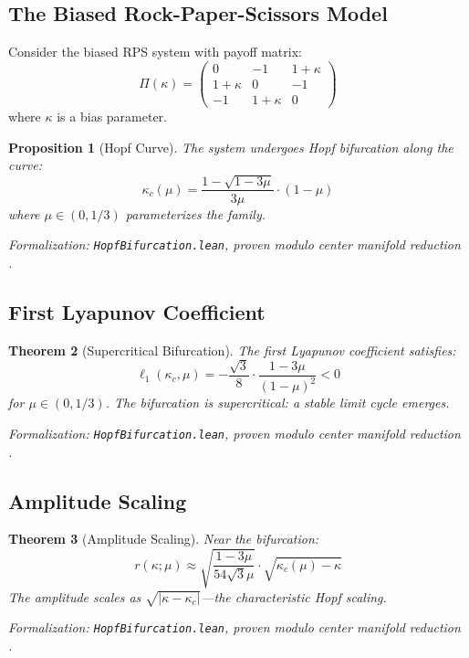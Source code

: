 \documentclass[12pt]{article}
\newtheorem{theorem}{Theorem}[section]
\newtheorem{proposition}[theorem]{Proposition}
\begin{document}
\subsection{The Biased Rock-Paper-Scissors Model}

Consider the biased RPS system with payoff matrix:
\[
\Pi(\kappa) = \begin{pmatrix} 0 & -1 & 1+\kappa \\ 1+\kappa & 0 & -1 \\ -1 & 1+\kappa & 0 \end{pmatrix}
\]
where $\kappa$ is a bias parameter.

\begin{proposition}[Hopf Curve]
The system undergoes Hopf bifurcation along the curve:
\[
\kappa_c(\mu) = \frac{1 - \sqrt{1 - 3\mu}}{3\mu} \cdot (1 - \mu)
\]
where $\mu \in (0, 1/3)$ parameterizes the family.
\end{proposition}
\noindent\textit{Formalization: \texttt{HopfBifurcation.lean}, proven modulo center manifold reduction \citep{guckenheimer1983nonlinear}.}

\subsection{First Lyapunov Coefficient}

\begin{theorem}[Supercritical Bifurcation]
The first Lyapunov coefficient satisfies:
\[
\ell_1(\kappa_c, \mu) = -\frac{\sqrt{3}}{8} \cdot \frac{1 - 3\mu}{(1 - \mu)^2} < 0
\]
for $\mu \in (0, 1/3)$. The bifurcation is supercritical: a stable limit cycle emerges.
\end{theorem}
\noindent\textit{Formalization: \texttt{HopfBifurcation.lean}, proven modulo center manifold reduction \citep{guckenheimer1983nonlinear}.}

\subsection{Amplitude Scaling}

\begin{theorem}[Amplitude Scaling]
Near the bifurcation:
\[
r(\kappa; \mu) \approx \sqrt{\frac{1 - 3\mu}{54\sqrt{3}\mu}} \cdot \sqrt{\kappa_c(\mu) - \kappa}
\]
The amplitude scales as $\sqrt{|\kappa - \kappa_c|}$---the characteristic Hopf scaling.
\end{theorem}
\noindent\textit{Formalization: \texttt{HopfBifurcation.lean}, proven modulo center manifold reduction \citep{guckenheimer1983nonlinear}.}
\end{document}
